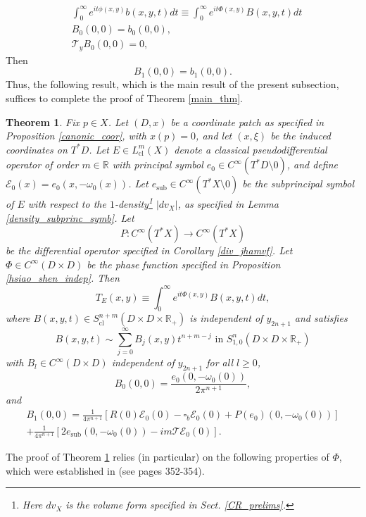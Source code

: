 \documentclass{article}
\newtheorem{theorem}{Theorem}[section]
\newcommand{\RR}{\mathbb R}
\newcommand{\mce}{\mathcal E}
\newcommand{\mct}{\mathcal T}
\DeclareMathOperator{\sub}{sub}
\DeclareMathOperator{\cl}{cl}
\begin{document}
$$\begin{aligned} & \int_0^\infty e^{it \phi(x,y)} b(x,y,t) dt \equiv \int_0^\infty e^{it \Phi(x,y)} B(x,y,t) dt\\ & B_0(0,0) = b_0(0,0),\\ &\mct_y B_0(0,0) = 0, \end{aligned}$$
Then $$B_1(0,0) = b_1(0,0).$$ Thus, the following result, which is the main result of the present subsection, suffices to complete the proof of Theorem \ref{main_thm}.
%
\begin{theorem}\label{main_thm_exp_sec} Fix $p \in X$. Let $(D,x)$ be a coordinate patch as specified in Proposition \ref{canonic_coor}, with $x(p) = 0$, and let $(x,\xi)$ be the induced coordinates on $T^*D$.  Let $E\in L^m_{\cl}(X)$ denote a classical pseudodifferential operator of order $m \in \mathbb R$ with principal symbol $e_0 \in C^\infty(T^*D \setminus 0)$, and define $\mce_0(x) = e_0(x, -\omega_0(x))$.  Let $e_{\sub} \in C^\infty(T^*X\setminus 0)$ be the subprincipal symbol of $E$ with respect to the $1$-density\footnote{Here $dv_X$ is the volume form specified in Sect. \ref{CR_prelims}.} $|dv_X|$, as specified in Lemma \ref{density_subprinc_symb}. Let $$P : C^\infty(T^*X) \to C^\infty(T^*X)$$ be the differential operator specified in Corollary \ref{div_jhamvf}. Let $\Phi \in C^\infty(D \times D)$ be the phase function specified in Proposition \ref{hsiao_shen_indep}. Then
\begin{equation*} T_E(x,y) \equiv \int_0^\infty e^{it  \Phi(x,y)} B(x,y,t) dt,\end{equation*}
where $B(x,y,t) \in S^{n+m}_{\cl}(D \times D \times \RR_+)$ is independent of $y_{2n+1}$ and satisfies
\begin{equation*} B(x,y,t) \sim \sum_{j=0}^\infty B_{j}(x,y) t^{n+m-j}\text{ in } S^n_{1,0}(D \times D \times \RR_+)\end{equation*}
with $B_{l} \in C^\infty(D \times D)$ independent of $y_{2n+1}$ for all $l \ge 0$, \begin{equation*}B_{0}(0,0) = \frac{e_0(0, -\omega_0(0))}{2\pi^{n+1}},\end{equation*}
and \begin{multline*} B_{1}(0,0) = \frac 1 {4\pi^{n+1}}\left[R(0) \mathcal E_0(0) -\square_b \mathcal E_0(0)  + P(e_0)(0, -\omega_0(0))\right]\\+\frac 1 {4\pi^{n+1}} \left[2 e_{\sub}(0, -\omega_0(0))-i m \mct \mce_0(0)\right]. \end{multline*}\end{theorem}
%
The proof of Theorem \ref{main_thm_exp_sec} relies (in particular) on the following properties of $\Phi$, which were established in \cite{hsiao_shen} (see pages 352-354).
\end{document}
